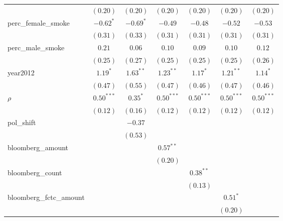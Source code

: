 \begin{table}[!h]
\begin{center}
\begin{tabular}{l c c c c c c }
                        & $(0.20)$     & $(0.20)$     & $(0.20)$     & $(0.20)$     & $(0.20)$     & $(0.20)$     \\
perc\_female\_smoke     & $-0.62^{*}$  & $-0.69^{*}$  & $-0.49$      & $-0.48$      & $-0.52$      & $-0.53$      \\
                        & $(0.31)$     & $(0.33)$     & $(0.31)$     & $(0.31)$     & $(0.31)$     & $(0.31)$     \\
perc\_male\_smoke       & $0.21$       & $0.06$       & $0.10$       & $0.09$       & $0.10$       & $0.12$       \\
                        & $(0.25)$     & $(0.27)$     & $(0.25)$     & $(0.25)$     & $(0.25)$     & $(0.26)$     \\
year2012                & $1.19^{*}$   & $1.63^{**}$  & $1.23^{**}$  & $1.17^{*}$   & $1.21^{**}$  & $1.14^{*}$   \\
                        & $(0.47)$     & $(0.55)$     & $(0.47)$     & $(0.46)$     & $(0.47)$     & $(0.46)$     \\
$\rho$                  & $0.50^{***}$ & $0.35^{*}$   & $0.50^{***}$ & $0.50^{***}$ & $0.50^{***}$ & $0.50^{***}$ \\
                        & $(0.12)$     & $(0.16)$     & $(0.12)$     & $(0.12)$     & $(0.12)$     & $(0.12)$     \\
pol\_shift              &              & $-0.37$      &              &              &              &              \\
                        &              & $(0.53)$     &              &              &              &              \\
bloomberg\_amount       &              &              & $0.57^{**}$  &              &              &              \\
                        &              &              & $(0.20)$     &              &              &              \\
bloomberg\_count        &              &              &              & $0.38^{**}$  &              &              \\
                        &              &              &              & $(0.13)$     &              &              \\
bloomberg\_fctc\_amount &              &              &              &              & $0.51^{*}$   &              \\
                        &              &              &              &              & $(0.20)$     &              \\

\end{tabular}
\end{center}
\end{table}
